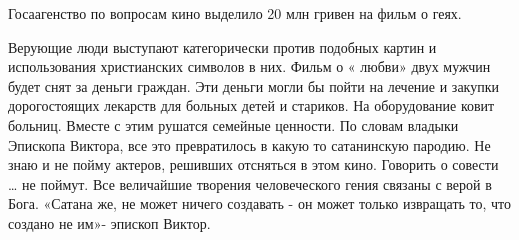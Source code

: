 Госаагенство  по вопросам кино выделило  20 млн гривен на фильм о геях.

Верующие люди выступают категорически против подобных картин и использования
христианских символов в них.  Фильм  о « любви» двух мужчин будет снят за
деньги граждан.  Эти деньги могли бы пойти на лечение и закупки дорогостоящих
лекарств для больных детей и стариков. На оборудование ковит больниц.  Вместе с
этим рушатся семейные ценности.  По словам владыки  Эпископа Виктора, все это
превратилось в какую то сатанинскую  пародию.  Не знаю и не пойму актеров,
решивших  отсняться в этом кино.  Говорить о совести … не поймут. Все
величайшие творения человеческого гения связаны с верой в Бога.  «Сатана же, не
может ничего создавать - он может только извращать то, что создано не им»-
эпископ Виктор.

